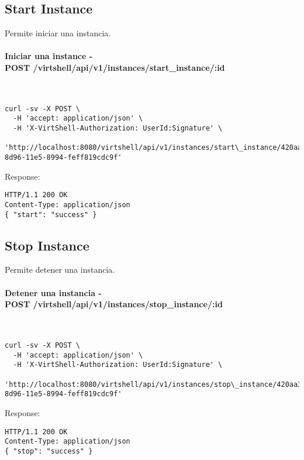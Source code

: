 \subsection{Start Instance}

Permite iniciar una instancia.

\paragraph{Iniciar una instance - \\ POST /virtshell/api/v1/instances/start\_instance/:id} ~\\


\begin{lstlisting}[style=json]
curl -sv -X POST \
  -H 'accept: application/json' \
  -H 'X-VirtShell-Authorization: UserId:Signature' \
   'http://localhost:8080/virtshell/api/v1/instances/start\_instance/420aa3f0-8d96-11e5-8994-feff819cdc9f'
\end{lstlisting}

Response:

\begin{lstlisting}[style=json]
HTTP/1.1 200 OK
Content-Type: application/json
{ "start": "success" }
\end{lstlisting}


\subsection{Stop Instance}

Permite detener una instancia.

\paragraph{Detener una instancia - \\ POST /virtshell/api/v1/instances/stop\_instance/:id} ~\\

\begin{lstlisting}[style=json]
curl -sv -X POST \
  -H 'accept: application/json' \
  -H 'X-VirtShell-Authorization: UserId:Signature' \
   'http://localhost:8080/virtshell/api/v1/instances/stop\_instance/420aa3f0-8d96-11e5-8994-feff819cdc9f'
\end{lstlisting}

Response:

\begin{lstlisting}[style=json]
HTTP/1.1 200 OK
Content-Type: application/json
{ "stop": "success" }
\end{lstlisting}


